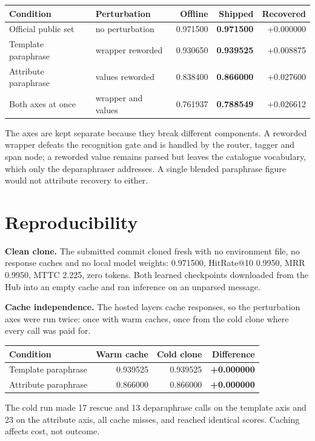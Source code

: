 \documentclass[11pt,a4paper]{article}
\begin{document}
\begin{center}\small\begin{tabular}{@{}llrrr@{}}\toprule
\textbf{Condition} & \textbf{Perturbation} & \textbf{Offline} & \textbf{Shipped} & \textbf{Recovered} \\ \midrule
Official public set & no perturbation & 0.971500 & \textbf{0.971500} & +0.000000 \\
Template paraphrase & wrapper reworded & 0.930650 & \textbf{0.939525} & +0.008875 \\
Attribute paraphrase & values reworded & 0.838400 & \textbf{0.866000} & +0.027600 \\
Both axes at once & wrapper and values & 0.761937 & \textbf{0.788549} & +0.026612 \\
\bottomrule\end{tabular}\end{center}
The axes are kept separate because they break different components. A reworded wrapper defeats the recognition gate and is handled by the router, tagger and span node; a reworded value remains parsed but leaves the catalogue vocabulary, which only the deparaphraser addresses. A single blended paraphrase figure would not attribute recovery to either.

\section{Reproducibility}
\textbf{Clean clone.} The submitted commit cloned fresh with no environment file, no response caches and no local model weights: 0.971500, HitRate@10 0.9950, MRR 0.9950, MTTC 2.225, zero tokens. Both learned checkpoints downloaded from the Hub into an empty cache and ran inference on an unparsed message.

\textbf{Cache independence.} The hosted layers cache responses, so the perturbation axes were run twice: once with warm caches, once from the cold clone where every call was paid for.

\begin{center}\small\begin{tabular}{@{}lrrr@{}}\toprule
\textbf{Condition} & \textbf{Warm cache} & \textbf{Cold clone} & \textbf{Difference} \\ \midrule
Template paraphrase & 0.939525 & 0.939525 & \textbf{+0.000000} \\
Attribute paraphrase & 0.866000 & 0.866000 & \textbf{+0.000000} \\
\bottomrule\end{tabular}\end{center}
The cold run made 17 rescue and 13 deparaphrase calls on the template axis and 23 on the attribute axis, all cache misses, and reached identical scores. Caching affects cost, not outcome.
\end{document}
